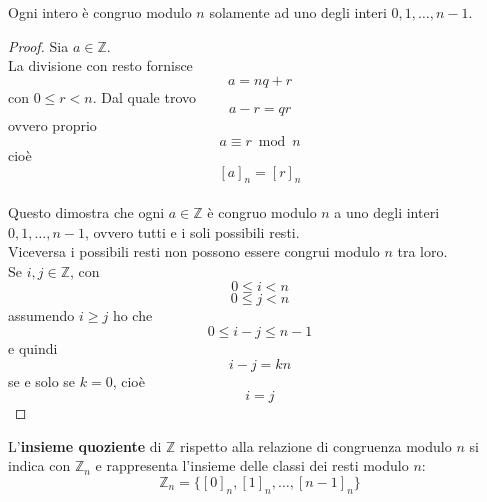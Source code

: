 \documentclass[a4paper,12pt, oneside]{book}
\begin{document}
		\begin{osservazione}
			Ogni intero è congruo modulo $n$ solamente ad uno degli interi $0,1,\dots,n-1$.
			
			\begin{proof}
				Sia $a \in \mathbb{Z}$.\\
				La divisione con resto fornisce
				$$a=nq+r$$ con $0 \leq r < n$. Dal quale trovo
				$$a-r=qr$$ ovvero proprio $$a \equiv r \bmod n$$
				cioè $$[a]_n = [r]_n$$\\
				Questo dimostra che ogni $a \in \mathbb{Z}$ è congruo modulo $n$ a uno degli interi $0,1,\dots,n-1$, ovvero tutti e i soli possibili resti.\\
				
				Viceversa i possibili resti non possono essere congrui modulo $n$ tra loro.\\Se $i,j \in \mathbb{Z}$, con $$0 \leq i < n$$ $$0 \leq j < n$$ assumendo $i \geq j$ ho che $$0 \leq i-j \leq n-1$$
				e quindi $$i − j = kn$$ se e solo se $k = 0$, cioè $$i = j$$
			\end{proof}
		\end{osservazione}
		\begin{definizione}
			L'\textbf{insieme quoziente} di $\mathbb{Z}$ rispetto alla relazione di congruenza modulo $n$ si indica con $\mathbb{Z}_n$ e rappresenta l'insieme delle classi dei resti modulo $n$:
			$$\mathbb{Z}_n = \{ [0]_n,[1]_n,\dots,[n-1]_n \}$$
		\end{definizione}
		
\end{document}
